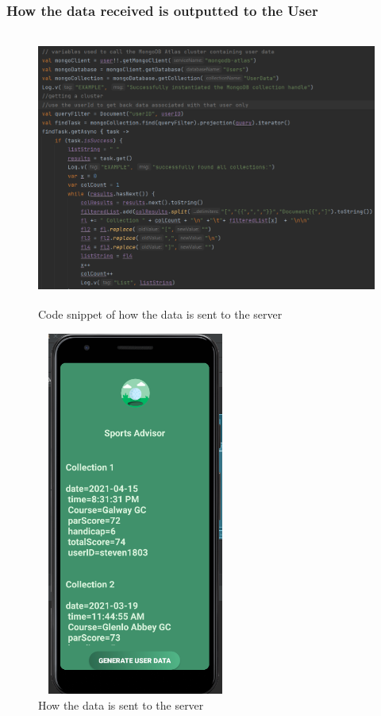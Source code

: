 \subsubsection{How the data received is outputted to the User}
\begin{figure}[H]
    \centering
    \includegraphics[width=15cm, height = 9cm]{img/getMongoDBdata.PNG}
    \caption{Code snippet of how the data is sent to the server}
    \label{fig:Code snippet of how the data is sent to the server}
\end{figure}

\begin{figure}[H]
    \centering
    \includegraphics[width=6.5cm, height =12cm]{img/userHistoryPage.PNG}
    \caption{How the data is sent to the server}
    \label{fig:How the data is sent to the server}
\end{figure}

